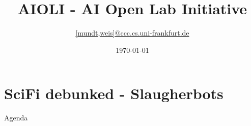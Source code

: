 \documentclass[aspectratio=169]{beamer}
\title{AIOLI - AI Open Lab Initiative}
\date{\today}
\author{\texorpdfstring{\url{[mundt,weis]@ccc.cs.uni-frankfurt.de}}{Tobias Weis}}
\institute{Systems Engineering for Computer Vision}
\begin{document}
{
\maketitle}


\section{SciFi debunked - Slaugherbots}
	\begin{frame}{Agenda}
		\tableofcontents

	\end{frame}
\end{document}
